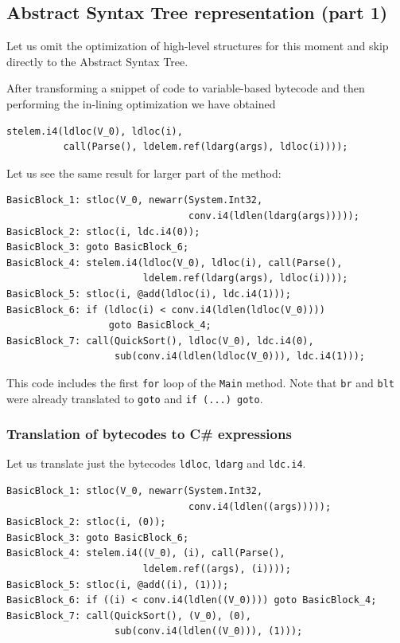 \documentclass[12pt,twoside,notitlepage]{report}
\begin{document}
\subsection{Abstract Syntax Tree representation (part 1)}

Let us omit the optimization of high-level structures
for this moment and skip directly to the Abstract Syntax Tree.

After transforming a snippet of code to variable-based bytecode
and then performing the in-lining optimization we have obtained

\begin{verbatim}
stelem.i4(ldloc(V_0), ldloc(i),
          call(Parse(), ldelem.ref(ldarg(args), ldloc(i))));
\end{verbatim}

Let us see the same result for larger part of the method:

\begin{verbatim}
BasicBlock_1: stloc(V_0, newarr(System.Int32,
                                conv.i4(ldlen(ldarg(args)))));
BasicBlock_2: stloc(i, ldc.i4(0));
BasicBlock_3: goto BasicBlock_6;
BasicBlock_4: stelem.i4(ldloc(V_0), ldloc(i), call(Parse(),
                        ldelem.ref(ldarg(args), ldloc(i))));
BasicBlock_5: stloc(i, @add(ldloc(i), ldc.i4(1)));
BasicBlock_6: if (ldloc(i) < conv.i4(ldlen(ldloc(V_0))))
                  goto BasicBlock_4; 
BasicBlock_7: call(QuickSort(), ldloc(V_0), ldc.i4(0),
                   sub(conv.i4(ldlen(ldloc(V_0))), ldc.i4(1)));
\end{verbatim}

This code includes the first \verb|for| loop of the \verb|Main|
method.  Note that \verb|br| and \verb|blt| were already
translated to \verb|goto| and \verb|if (...) goto|.

\subsubsection{Translation of bytecodes to C\# expressions}

Let us translate just the bytecodes \verb|ldloc|, \verb|ldarg|
and \verb|ldc.i4|.

\begin{verbatim}
BasicBlock_1: stloc(V_0, newarr(System.Int32,
                                conv.i4(ldlen((args)))));
BasicBlock_2: stloc(i, (0));
BasicBlock_3: goto BasicBlock_6;
BasicBlock_4: stelem.i4((V_0), (i), call(Parse(),
                        ldelem.ref((args), (i))));
BasicBlock_5: stloc(i, @add((i), (1)));
BasicBlock_6: if ((i) < conv.i4(ldlen((V_0)))) goto BasicBlock_4; 
BasicBlock_7: call(QuickSort(), (V_0), (0),
                   sub(conv.i4(ldlen((V_0))), (1)));
\end{verbatim}
\end{document}
